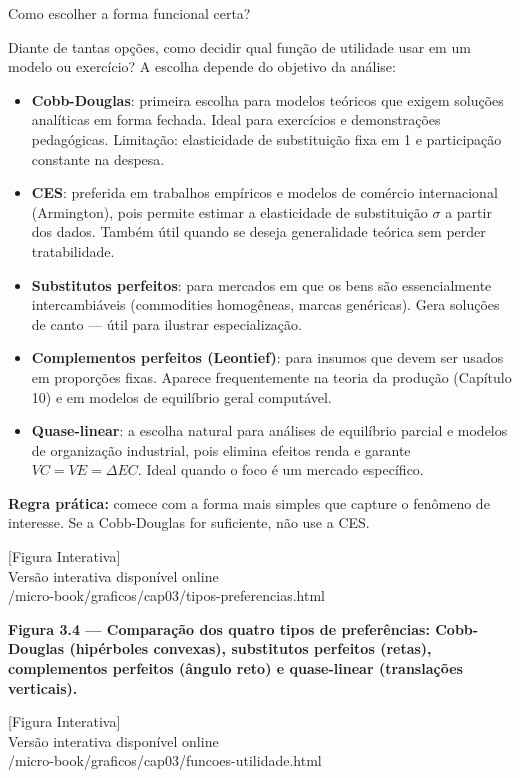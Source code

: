 \documentclass[11pt,twoside,openright]{book}
\newcommand{\figurePlaceholder}[1]{%
  \begin{center}
    \begin{tcolorbox}[
      width=0.85\textwidth,
      colback=graybg,
      colframe=gray,
      boxrule=0.5pt,
      arc=2pt,
      halign=center,
      valign=center,
      height=5cm
    ]
      \centering
      \vfill
      {\sffamily\color{gray}\large [Figura Interativa]}\\[6pt]
      {\sffamily\small\color{gray} Versão interativa disponível online}\\[4pt]
      {\ttfamily\tiny\color{gray} #1}
      \vfill
    \end{tcolorbox}
  \end{center}
}
\providecommand{\tightlist}{\setlength{\itemsep}{0pt}\setlength{\parskip}{0pt}}
\begin{document}
\begin{tipbox}{Como escolher a forma funcional certa?}

Diante de tantas opções, como decidir qual função de utilidade usar em
um modelo ou exercício? A escolha depende do objetivo da análise:

\begin{itemize}
\tightlist
\item
  \textbf{Cobb-Douglas}: primeira escolha para modelos teóricos que
  exigem soluções analíticas em forma fechada. Ideal para exercícios e
  demonstrações pedagógicas. Limitação: elasticidade de substituição
  fixa em 1 e participação constante na despesa.
\item
  \textbf{CES}: preferida em trabalhos empíricos e modelos de comércio
  internacional (Armington), pois permite estimar a elasticidade de
  substituição \(\sigma\) a partir dos dados. Também útil quando se
  deseja generalidade teórica sem perder tratabilidade.
\item
  \textbf{Substitutos perfeitos}: para mercados em que os bens são
  essencialmente intercambiáveis (commodities homogêneas, marcas
  genéricas). Gera soluções de canto --- útil para ilustrar
  especialização.
\item
  \textbf{Complementos perfeitos (Leontief)}: para insumos que devem ser
  usados em proporções fixas. Aparece frequentemente na teoria da
  produção (Capítulo 10) e em modelos de equilíbrio geral computável.
\item
  \textbf{Quase-linear}: a escolha natural para análises de equilíbrio
  parcial e modelos de organização industrial, pois elimina efeitos
  renda e garante \(VC = VE = \Delta EC\). Ideal quando o foco é um
  mercado específico.
\end{itemize}

\textbf{Regra prática:} comece com a forma mais simples que capture o
fenômeno de interesse. Se a Cobb-Douglas for suficiente, não use a CES.

\end{tipbox}

\figurePlaceholder{/micro-book/graficos/cap03/tipos-preferencias.html}

\textbf{Figura 3.4 --- Comparação dos quatro tipos de preferências:
Cobb-Douglas (hipérboles convexas), substitutos perfeitos (retas),
complementos perfeitos (ângulo reto) e quase-linear (translações
verticais).}

\figurePlaceholder{/micro-book/graficos/cap03/funcoes-utilidade.html}
\end{document}
